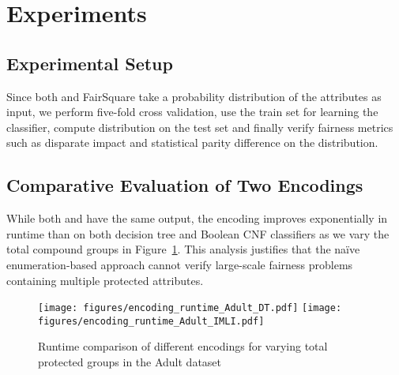 \section{Experiments}
\subsection{Experimental Setup}
Since both {\framework}  and FairSquare take a  probability distribution of the attributes as input, we perform five-fold cross validation, use the train set for learning the classifier, compute distribution on the test set and finally verify fairness metrics such as disparate impact and statistical parity difference on the distribution.

\subsection{Comparative Evaluation of Two Encodings}
\iffalse
\red{Accuracy is removed}
\textbf{Accuracy.} In Section~\ref{sec:framework},  we have theoretically shown the equivalence between RE and ER encodings  and experimentally validate this in Figure~\ref{fig:equivalence} where both encodings output the same value for different fairness metrics. In the RE encoding, we consider two variations: namely `RE' and `RE(cor)' where the former does not consider the correlation between the protected and the non-protected attributes and the later includes correlation. \blue{In Figure~\ref{fig:equivalence}, we find that disparate impact usually decreases when the correlation is considered. This result is justified by the implicit dependence between the protected and non-protected attributes that the classifiers learn during training.}
\fi

While both {\frameworkenum} and {\frameworklearn}  have the same output, the {\frameworklearn} encoding  improves exponentially  in runtime  than {\frameworkenum}  on both decision tree and Boolean CNF classifiers as we vary the total compound groups in Figure~\ref{fig:runtime_diff_encodings}. This analysis justifies that the na\"ive enumeration-based approach cannot verify large-scale fairness problems containing multiple protected attributes. 
\begin{figure}[t!]
	\begin{center}
		\texttt{[image: figures/encoding\_runtime\_Adult\_DT.pdf]}
		\texttt{[image: figures/encoding\_runtime\_Adult\_IMLI.pdf]}
		\hfill
		\caption{Runtime comparison of different encodings for varying total protected groups in the Adult dataset}
		\label{fig:runtime_diff_encodings}
	\end{center}
\end{figure}\textbf{}

